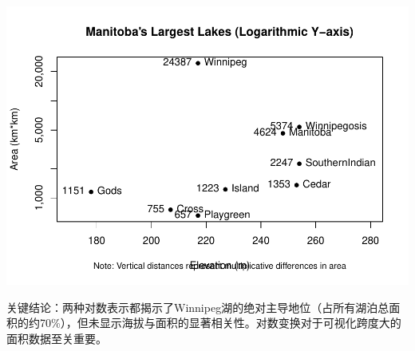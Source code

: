 \documentclass[
]{article}
\begin{document}
\includegraphics{3220103606-homework1_files/figure-latex/unnamed-chunk-16-1.pdf}

关键结论：两种对数表示都揭示了Winnipeg湖的绝对主导地位（占所有湖泊总面积的约70\%），但未显示海拔与面积的显著相关性。对数变换对于可视化跨度大的面积数据至关重要。
\end{document}
